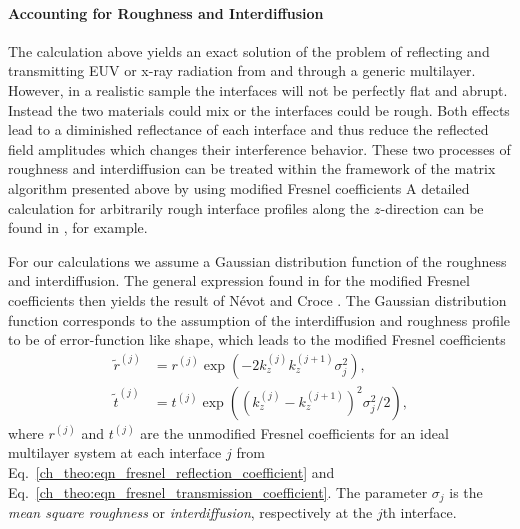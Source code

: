 \paragraph{Accounting for Roughness and Interdiffusion}
The calculation above yields an exact solution of the problem of reflecting and transmitting EUV or x-ray radiation from and through a generic multilayer. However, in a realistic sample the interfaces will not be perfectly flat and abrupt. Instead the two materials could mix or the interfaces could be rough. Both effects lead to a diminished reflectance of each interface and thus reduce the reflected field amplitudes which changes their interference behavior. These two processes of roughness and interdiffusion can be treated within the framework of the matrix algorithm presented above by using modified Fresnel coefficients A detailed calculation for arbitrarily rough interface profiles along the $z$-direction can be found in \cite{vidal_metallic_1984}, for example.

For our calculations we assume a Gaussian distribution function of the roughness and interdiffusion. The general expression found in \cite{vidal_metallic_1984} for the modified Fresnel coefficients then yields the result of N\'{e}vot and Croce \cite{croce_p._etude_1976, nevot_l._caracterisation_1980}. The Gaussian distribution function corresponds to the assumption of the interdiffusion and roughness profile to be of error-function like shape, which leads to the modified Fresnel coefficients
\begin{align}
       \tilde{r}^{(j)} &= r^{(j)} \exp(-2 k_z^{(j)} k_z^{(j+1)} 
\sigma_j^2)\text{,} \nonumber \\
       \tilde{t}^{(j)} &= t^{(j)} \exp((k_z^{(j)} - k_z^{(j+1)})^2 \sigma_j^2/2) 
\text{,} \label{eqn:mod_fresnel}
\end{align}
where $r^{(j)}$ and $t^{(j)}$ are the unmodified Fresnel coefficients for an ideal multilayer system at each interface $j$ from Eq.~\eqref{ch_theo:eqn_fresnel_reflection_coefficient} and Eq.~\eqref{ch_theo:eqn_fresnel_transmission_coefficient}. The parameter $\sigma_j$ is the \emph{mean square roughness} or \emph{interdiffusion}, respectively at the $j$th interface.



